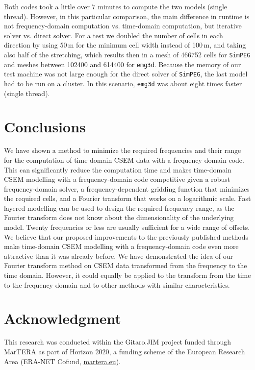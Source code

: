 \documentclass[
    manuscript,
  ]{geophysics}
\newcommand{\emg}[2]{\texttt{emg#1#2}\xspace}
\newcommand{\simpeg}{\texttt{SimPEG}\xspace}
\begin{document}
Both codes took a little over 7 minutes to compute the two models (single
thread). However, in this particular comparison, the main difference in runtime
is not frequency-domain computation vs. time-domain computation, but iterative
solver vs. direct solver. For a test we doubled the number of cells in each
direction by using 50\,m for the minimum cell width instead of 100\,m, and
taking also half of the stretching, which results then in a mesh of
\num{466752} cells for \simpeg and meshes between \num{102400} and \num{614400}
for \emg3d. Because the memory of our test machine was not large enough for the
direct solver of \simpeg, the last model had to be run on a cluster. In this
scenario, \emg3d was about eight times faster (single thread).

\section{Conclusions}

We have shown a method to minimize the required frequencies and their range for
the computation of time-domain CSEM data with a frequency-domain code. This can
significantly reduce the computation time and makes time-domain CSEM modelling
with a frequency-domain code competitive given a robust frequency-domain
solver, a frequency-dependent gridding function that minimizes the required
cells, and a Fourier transform that works on a logarithmic scale. Fast layered
modelling can be used to design the required frequency range, as the Fourier
transform does not know about the dimensionality of the underlying model.
Twenty frequencies or less are usually sufficient for a wide range of offsets.
We believe that our proposed improvements to the previously published methods
make time-domain CSEM modelling with a frequency-domain code even more
attractive than it was already before. We have demonstrated the idea of our
Fourier transform method on CSEM data transformed from the frequency to the
time domain. However, it could equally be applied to the transform from the
time to the frequency domain and to other methods with similar
characteristics.

\section{Acknowledgment}

This research was conducted within the Gitaro.JIM project funded through
MarTERA as part of Horizon 2020, a funding scheme of the European Research Area
(ERA-NET Cofund, \href{https://www.martera.eu}{martera.eu}).
\end{document}
